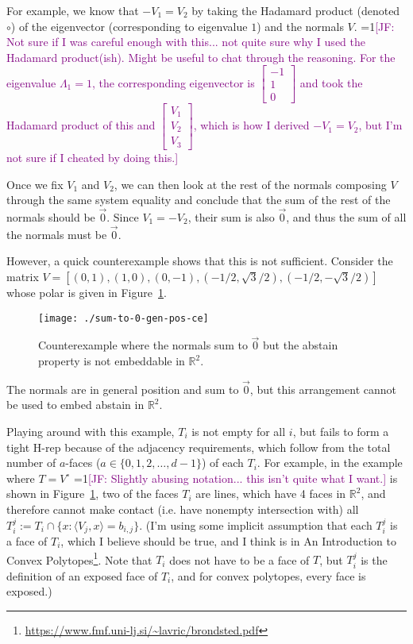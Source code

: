 \documentclass[12pt]{article}
\newcommand{\Comments}{1}
\newcommand{\mynote}[2]{\ifnum\Comments=1\textcolor{#1}{#2}\fi}
\newcommand{\jessie}[1]{\mynote{purple}{[JF: #1]}}
\newcommand{\reals}{\mathbb{R}}
\newcommand{\inprod}[2]{\langle #1, #2 \rangle}
\begin{document}
    For example, we know that $-V_1 = V_2$ by taking the Hadamard product (denoted $\circ$) of the eigenvector (corresponding to eigenvalue $1$) and the normals $V$.
    \jessie{Not sure if I was careful enough with this... not quite sure why I used the Hadamard product(ish).  Might be useful to chat through the reasoning.
    For the eigenvalue $\Lambda_1 = 1$, the corresponding eigenvector is $\begin{bmatrix} -1 \\ 1 \\0 \end{bmatrix}$ and took the Hadamard product of this and $\begin{bmatrix} V_1 \\ V_2 \\V_3 \end{bmatrix}$, which is how I derived $-V_1 = V_2$, but I'm not sure if I cheated by doing this.}

\bigskip
    
    Once we fix $V_1$ and $V_2$, we can then look at the rest of the normals composing $V$ through the same system equality and conclude that the sum of the rest of the normals should be $\vec{0}$.
    Since $V_1 = -V_2$, their sum is also $\vec{0}$, and thus the sum of all the normals must be $\vec{0}$.
    
    However, a quick counterexample shows that this is not sufficient.
    Consider the matrix $V = [(0,1), (1,0), (0,-1), (-1/2, \sqrt{3} / 2), (-1/2, -\sqrt{3} / 2)]$ whose polar is given in Figure~\ref{fig:sum-to-0-gen-pos-ce}.
    
	\begin{figure}
	\centering
	\texttt{[image: ./sum-to-0-gen-pos-ce]}
	\caption{Counterexample where the normals sum to $\vec{0}$ but the abstain property is not embeddable in $\reals^2$.}
	\label{fig:sum-to-0-gen-pos-ce}
	\end{figure}

	The normals are in general position and sum to $\vec{0}$, but this arrangement cannot be used to embed abstain in $\reals^2$.
	
	Playing around with this example, $T_i$ is not empty for all $i$, but fails to form a tight H-rep because of the adjacency requirements, which follow from the total number of $a$-faces ($a \in \{0, 1, 2, \ldots, d-1\}$) of each $T_i$.
	For example, in the example where $T = V^\circ$ \jessie{Slightly abusing notation... this isn't quite what I want.} is shown in Figure~\ref{fig:sum-to-0-gen-pos-ce}, two of the faces $T_i$ are lines, which have 4 faces in $\reals^2$, and therefore cannot make contact (i.e. have nonempty intersection with) all $T_i^j := T_i \cap \{x : \inprod{V_j}{x} = b_{i,j} \}$.
	(I'm using some implicit assumption that each $T_i^j$ is a face of $T_i$, which I believe should be true, and I think is in An Introduction to Convex Polytopes\footnote{\url{https://www.fmf.uni-lj.si/~lavric/brondsted.pdf}}.  Note that $T_i$ does not have to be a face of $T$, but $T_i^j$ is the definition of an exposed face of $T_i$, and for convex polytopes, every face is exposed.)
	
\end{document}
